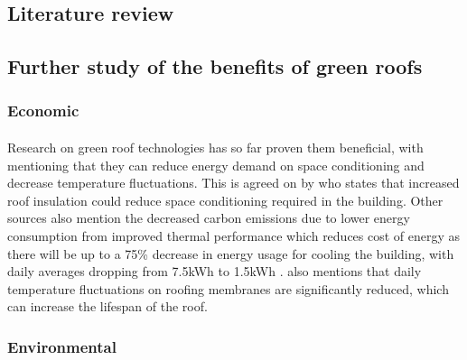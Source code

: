 \documentclass[a4paper]{article}
\begin{document}
\begin{multicols}{2}
  \section{Literature review}
  \subsection{Further study of the benefits of green roofs} \label{sec:grben}
  \subsubsection{Economic}
  \paragraph{} Research on green roof technologies has so far proven them
  beneficial, with \cite{energeff} mentioning that they can reduce energy
  demand on space conditioning and decrease temperature fluctuations. This
  is agreed on by \cite{CFGRSG} who states that increased roof insulation
  could reduce space conditioning required in the building. Other
  sources also mention the decreased carbon emissions due to lower energy
  consumption from improved thermal performance \parencite{CommAwareGBSyd}
  which reduces cost of energy as there will be up to a 75\%
  decrease in energy usage for cooling the building, with daily averages
  dropping from 7.5kWh to 1.5kWh \parencite{energeff}. \textcite{energeff} also
  mentions that daily temperature fluctuations on roofing membranes are
  significantly reduced, which can increase the lifespan of the roof.


  \subsubsection{Environmental}

\end{multicols}
\end{document}
